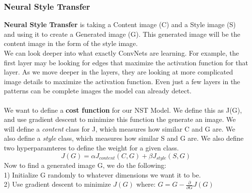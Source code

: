 \documentclass[11pt, a4paper]{article}
\begin{document}
\begin{spacing}{1.1}
	\subsubsection{Neural Style Transfer}
	\textbf{Neural Style Transfer} is taking a Content image (C) and a Style image (S) and using it to create a Generated image (G). This generated image will be the content image in the form of the style image. \vspace*{2mm}\\
	We can look deeper into what exactly ConvNets are learning. For example, the first layer may be looking for edges that maximize the activation function for that layer. As we move deeper in the layers, they are looking at more complicated image details to maximize the activation function. Even just a few layers in the patterns can be complete images the model can already detect. \\~\\
	We want to define a \textbf{cost function} for our NST Model. We define this as J(G), and use gradient descent to minimize this function the generate an image. We will define a \textit{content} class for J, which measures how similar C and G are. We also define a \textit{style} class, which measures how similar S and G are. We also define two hyperparamteres to define the weight for a given class. 
	$$ J(G) = \alpha J_{content}(C,G) + \beta J_{style}(S,G)$$
	Now to find a generated image G, we do the following: \\
	1) Initialize G randomly to whatever dimensions we want it to be. \\
	2) Use gradient descent to minimize $J(G)$ where: $G = G - \frac{\partial}{\partial G} J(G)$ \newpage


\end{spacing}
\end{document}
